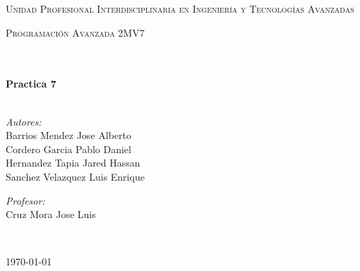 \documentclass[11pt]{article}
\begin{document}
\begin{center}
\textsc{\LARGE Unidad Profesional Interdisciplinaria en Ingenier\'ia y				%
Tecnolog\'ias Avanzadas}\\[1.5cm]													%

\begin{minipage}{0.9\textwidth} 
\begin{center}																					%
\textsc{\LARGE Programación Avanzada 2MV7}
\end{center}
\end{minipage}\\[0.5cm]
 			\vspace*{1cm}																		%
\HRule \\[0.4cm]																	%
{ \huge \bfseries Practica 7}\\[0.4cm]	%
\HRule \\[1.5cm]																	%
\begin{minipage}{0.46\textwidth}													%
\begin{flushleft} \large															%
\emph{Autores:}\\	
Barrios Mendez Jose Alberto\\
Cordero Garcia Pablo Daniel\\
Hernandez Tapia Jared Hassan\\
Sanchez Velazquez Luis Enrique


\end{flushleft}																		%
\end{minipage}		
\begin{minipage}{0.52\textwidth}		
\vspace{-0.6cm}											%
\begin{flushright} \large															%
\emph{Profesor:} \\																	%
Cruz Mora Jose Luis\\
\end{flushright}																	%
\end{minipage}	
\vspace*{1cm}
 	
 		\\																		%
\vspace{2cm} 																				
\begin{center}																					
{\large \today}																	%
 			\end{center}												  						
\end{center}							 											
																					
\end{document}
